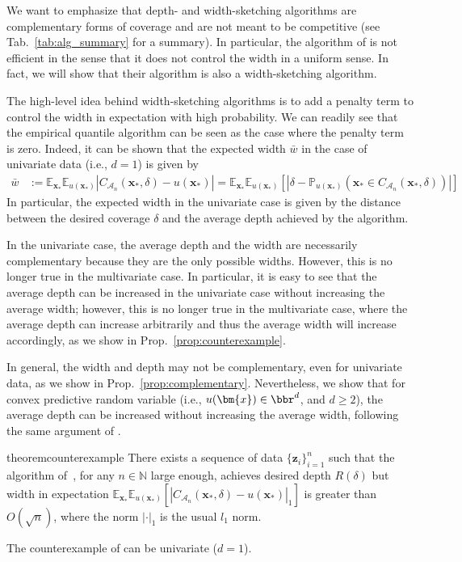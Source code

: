 We want to emphasize that depth- and width-sketching algorithms are complementary forms of coverage and are not meant to be competitive (see Tab.~\ref{tab:alg_summary} for a summary). In particular, the algorithm of \cite{angelopoulos2024conformal} is not efficient in the sense that it does not control the width in a uniform sense. In fact, we will show that their algorithm is also a width-sketching algorithm.

The high-level idea behind width-sketching algorithms is to add a penalty term to control the width in expectation with high probability. 
We can readily see that the empirical quantile algorithm can be seen as the case where the penalty term is zero. Indeed, it can be shown \citep[Sec. 13.3.1 in][]{shao2003mathematical} that the expected width $\bar{w}$ in the case of univariate data (i.e., $d=1$) is given by
\begin{equation} \label{eq:width_bias}
\begin{split}
  \bar{w} &:= \mathbb{E}_{\bm{x}_*} \mathbb{E}_{u(\bm{x_*})} | C_{\mathcal{A}_{n}}(\bm{x_*},\delta) - u(\bm{x_*})|  = \mathbb{E}_{\bm{x}_*} \mathbb{E}_{u(\bm{x_*})}[|\delta - \mathbb{P}_{u(\bm{x_*})}(\bm{x_*} \in C_{\mathcal{A}_{n}}(\bm{x_*},\delta))|]
\end{split}
\end{equation}
In particular, the expected width in the univariate case is given by the distance between the desired coverage $\delta$ and the average depth achieved by the algorithm. 

In the univariate case, the average depth and the width are necessarily complementary because they are the only possible widths. However, this is no longer true in the multivariate case. In particular, it is easy to see that the average depth can be increased in the univariate case without increasing the average width; however, this is no longer true in the multivariate case, where the average depth can increase arbitrarily and thus the average width will increase accordingly, as we show in Prop.~\ref{prop:counterexample}. 

In general, the width and depth may not be complementary, even for univariate data, as we show in Prop.~\ref{prop:complementary}. Nevertheless, we show that for convex predictive random variable (i.e., $u(\bm{x}) \in \bbr^{d}$, and $d \geq 2$), the average depth can be increased without increasing the average width, following the same argument of \cite{angelopoulos2024conformal}. 
\begin{restatable}[Counterexample]{theorem}{counterexample}\label{prop:counterexample}
  There exists a sequence of data  $\{ \bm z_i \}_{i=1}^n$ such that the algorithm of~\cite{angelopoulos2024conformal}, for any $n \in \mathbb{N}$ large enough, achieves desired depth $R(\delta)$ but width in expectation $\mathbb{E}_{\bm{x}_*} \mathbb{E}_{u(\bm{x_*})}[| C_{\mathcal{A}_{n}}(\bm{x_*},\delta) - u(\bm{x_*})|_1]$ is greater than $O(\sqrt{n})$, where the norm $|\cdot|_1$ is the usual $l_1$ norm.
\end{restatable}
\begin{remark}
  \label{rem:counterexample}
  The counterexample of \cite{angelopoulos2024conformal} can be univariate ($d=1$). 
\end{remark}

